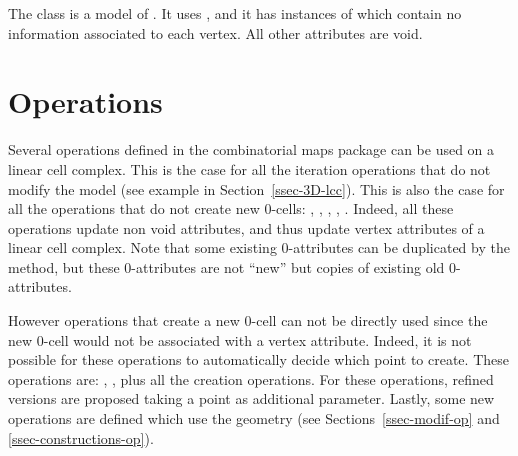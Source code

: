 The class  is a
model of . It uses ,
and it has instances of 
which contain no information associated to each vertex. All other
attributes are void.  

\section{Operations}

Several operations defined in the combinatorial maps package can be
used on a linear cell complex. This is the case for all the iteration
operations that do not modify the model (see example in 
Section~\ref{ssec-3D-lcc}). This is also the case for
all the operations that do not create new 0-cells: ,
, , ,
.  Indeed, all these operations update
non void attributes, and thus update vertex attributes of a linear
cell complex. Note that some existing 0-attributes can be duplicated
by the  method, but these 0-attributes are not ``new'' but
copies of existing old 0-attributes.

However operations that create a new 0-cell can not be directly used
since the new 0-cell would not be associated with a vertex
attribute. Indeed, it is not possible for these operations to
automatically decide which point to create. These operations are:
, 
, plus all the creation
operations. For these operations, refined versions are proposed taking
a point as additional parameter.  Lastly, some new operations are
defined which use the geometry (see Sections~\ref{ssec-modif-op} and
\ref{ssec-constructions-op}).




